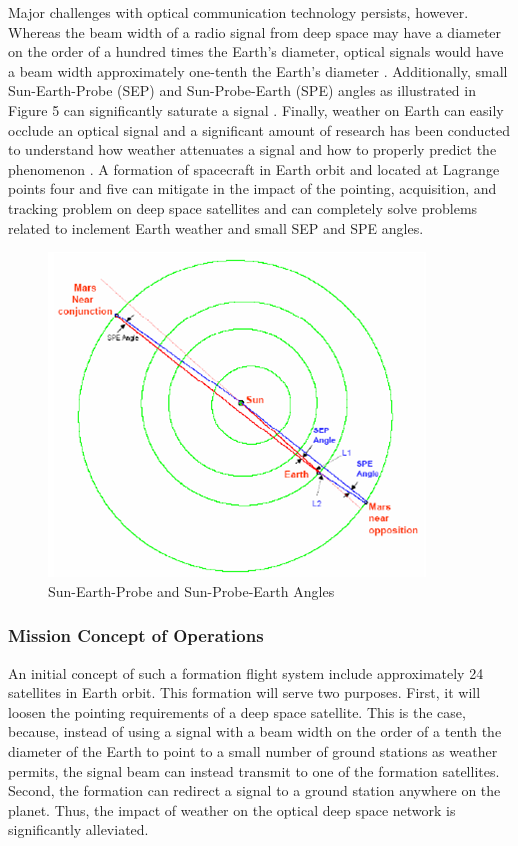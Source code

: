 Major challenges with optical communication technology persists, however. Whereas the beam width of a radio signal from deep space may have a diameter on the order of a hundred times the Earth's diameter, optical signals would have a beam width approximately one-tenth the Earth's diameter \cite{Hemmati2}. Additionally, small Sun-Earth-Probe (SEP) and Sun-Probe-Earth (SPE) angles as illustrated in Figure 5 can significantly saturate a signal \cite{Biswas}. Finally, weather on Earth can easily occlude an optical signal and a significant amount of research has been conducted to understand how weather attenuates a signal and how to properly predict the phenomenon \cite{Wojcik} \cite{Shaik} \cite{Hemmati3} \cite{Cowles} \cite{Cowles2} \cite{Cowles3} \cite{Shaik2}. A formation of spacecraft in Earth orbit and located at Lagrange points four and five can mitigate in the impact of the pointing, acquisition, and tracking problem on deep space satellites and can completely solve problems related to inclement Earth weather and small SEP and SPE angles.

\begin{figure}[!ht]
\centering
\includegraphics[scale=0.75]{SEPSPE.png}
\caption{Sun-Earth-Probe and Sun-Probe-Earth Angles}
\end{figure}

\subsubsection{Mission Concept of Operations}
An initial concept of such a formation flight system include approximately 24 satellites in Earth orbit. This formation will serve two purposes. First, it will loosen the pointing requirements of a deep space satellite. This is the case, because, instead of using a signal with a beam width on the order of a tenth the diameter of the Earth to point to a small number of ground stations as weather permits, the signal beam can instead transmit to one of the formation satellites. Second, the formation can redirect a signal to a ground station anywhere on the planet. Thus, the impact of weather on the optical deep space network is significantly alleviated. 

